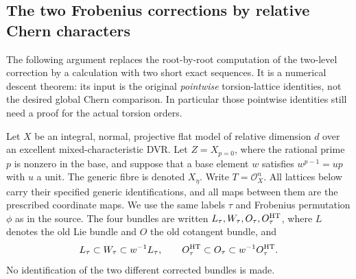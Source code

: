 \subsection{The two Frobenius corrections by relative Chern characters}
\label{sec:relative-chern-correction}

The following argument replaces the root-by-root computation of the
two-level correction by a calculation with two short exact sequences.
It is a numerical descent theorem: its input is the original
\emph{pointwise} torsion-lattice identities, not the desired global
Chern comparison. In particular those pointwise identities still need
a proof for the actual torsion orders.

Let \(X\) be an integral, normal, projective flat model of relative
dimension \(d\) over an excellent mixed-characteristic DVR. Let
\(Z=X_{p=0}\), where the rational prime \(p\) is nonzero in the
base, and suppose that a base element \(w\) satisfies
\(w^{p-1}=up\) with \(u\) a unit. The generic fibre is denoted \(X_\eta\).
Write \(T=\mathcal O_X^n\). All lattices below carry their
specified generic identifications, and all maps between them are
the prescribed coordinate maps. We use the same
labels \(\tau\) and Frobenius permutation \(\phi\) as in the source.
The four bundles are written \(L_\tau,W_\tau,O_\tau,O_\tau^{\rm HT}\),
where \(L\) denotes the old Lie bundle and \(O\) the old
cotangent bundle, and
\[
 L_\tau\subset W_\tau\subset w^{-1}L_\tau,\qquad
 O_\tau^{\rm HT}\subset O_\tau\subset w^{-1}O_\tau^{\rm HT}.
\]
No identification of the two different corrected bundles is made.

